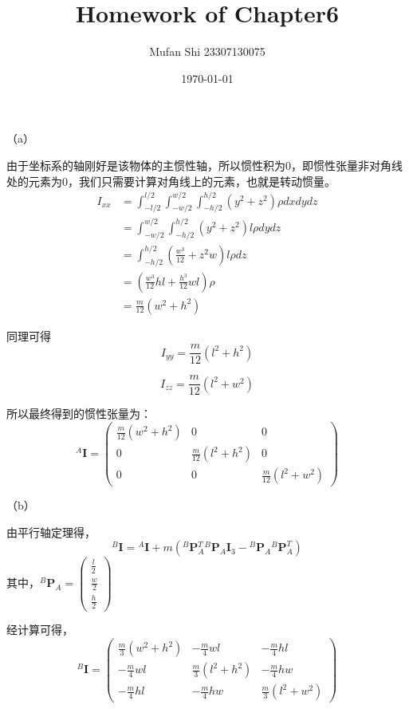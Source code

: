 \documentclass{homework}
\author{Mufan Shi 23307130075}
\date{\today}
\title{Homework of Chapter6}
\begin{document}
 \maketitle

\question

\begin{sol}

（a）

由于坐标系的轴刚好是该物体的主惯性轴，所以惯性积为0，即惯性张量非对角线处的元素为0，我们只需要计算对角线上的元素，也就是转动惯量。
\begin{align*}
    I_{xx} &= \int_{-l/2}^{l/2} \int_{-w/2}^{w/2} \int_{-h/2}^{h/2} (y^2 + z^2) \rho dx dy dz \\
    &= \int_{-w/2}^{w/2} \int_{-h/2}^{h/2} (y^2 + z^2) l \rho dy dz \\
    &= \int_{-h/2}^{h/2} (\frac{w^3}{12} + z^2 w) l \rho dz \\
    &= (\frac{w^3}{12} h l + \frac{h^3}{12} w l) \rho \\
    &= \frac{m}{12} (w^2 + h^2)
\end{align*}

同理可得
\[
I_{yy} = \frac{m}{12} (l^2 + h^2)
\] 

\[
I_{zz} = \frac{m}{12} (l^2 + w^2)
\]

所以最终得到的惯性张量为：
\[
{^A}\mathbf{I} = 
\begin{pmatrix}
  \frac{m}{12}(w^2 + h^2) & 0 & 0 \\
  0 & \frac{m}{12}(l^2 + h^2) & 0 \\
  0 & 0 & \frac{m}{12}(l^2 + w^2)
\end{pmatrix}
\]


（b）

由平行轴定理得，
\[
{^B}\mathbf{I} = {^A}\mathbf{I} + m ({^B}\mathbf{P}{_A^T} {^B}\mathbf{P}_{A} \mathbf{I}{_3} - {^B}\mathbf{P}_{A} {^B}\mathbf{P}_{A}^T)
\]
其中，${^B}\mathbf{P}_{A} = \begin{pmatrix}
\frac{l}{2} \\ \frac{w}{2} \\ \frac{h}{2}
\end{pmatrix}$

经计算可得，
\[
  {^B}\mathbf{I} = 
  \begin{pmatrix}
    \frac{m}{3}(w^2 + h^2) & -\frac{m}{4}wl & -\frac{m}{4}hl \\
    -\frac{m}{4}wl & \frac{m}{3}(l^2 + h^2) & -\frac{m}{4}hw \\
    -\frac{m}{4}hl & -\frac{m}{4}hw & \frac{m}{3}(l^2 + w^2)
  \end{pmatrix}
\]

\end{sol}
\end{document}
